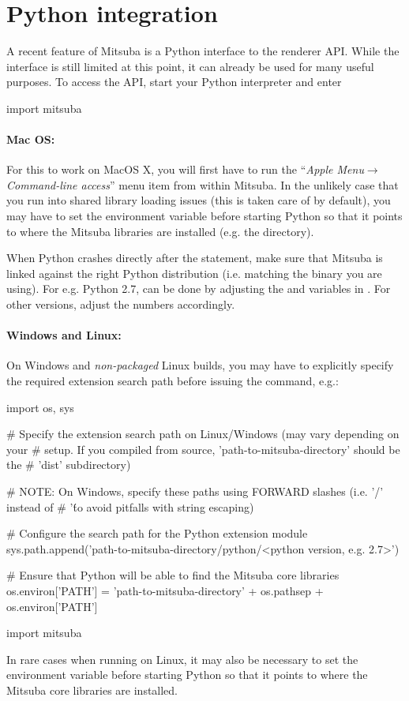 \section{Python integration}
\label{sec:python}
A recent feature of Mitsuba is a Python interface to the renderer API.
While the interface is still limited at this point, it can already be
used for many useful purposes. To access the API, start your Python
interpreter and enter
\begin{python}
import mitsuba
\end{python}
\paragraph{Mac OS:}
For this to work on MacOS X, you will first have to run the ``\emph{Apple
Menu}$\to$\emph{Command-line access}'' menu item from within Mitsuba.
In the unlikely case that you run into shared library loading issues (this is
taken care of by default), you may have to set the 
environment variable before starting Python so that it points to where the
Mitsuba libraries are installed (e.g. the 
directory).

When Python crashes directly after the  statement,
make sure that Mitsuba is linked against the right Python distribution
(i.e. matching the  binary you are using). For e.g. Python
2.7, can be done by adjusting the  and
 variables in . For other versions,
adjust the numbers accordingly.

\paragraph{Windows and Linux:}
On Windows and \emph{non-packaged} Linux builds, you may have to explicitly
specify the required extension search path before issuing the  command, e.g.:
\begin{python}
import os, sys

# Specify the extension search path on Linux/Windows (may vary depending on your
# setup. If you compiled from  source, 'path-to-mitsuba-directory' should be the
# 'dist' subdirectory)

# NOTE: On Windows, specify these paths using FORWARD slashes (i.e. '/' instead of
# '\' to avoid pitfalls with string escaping)

# Configure the search path for the Python extension module
sys.path.append('path-to-mitsuba-directory/python/<python version, e.g. 2.7>')

# Ensure that Python will be able to find the Mitsuba core libraries
os.environ['PATH'] = 'path-to-mitsuba-directory' + os.pathsep + os.environ['PATH']

import mitsuba
\end{python}
In rare cases when running on Linux, it may also be necessary to set the
 environment variable before starting Python so that it
points to where the Mitsuba core libraries are installed.

